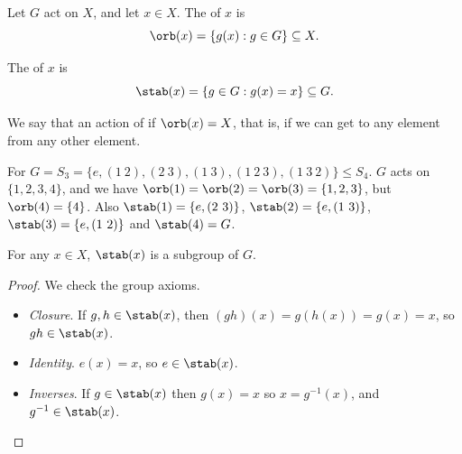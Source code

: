 \documentclass[a4paper]{scrartcl}
\begin{document}
\begin{center}
	

\end{center}

\begin{definition}[Orbit]
Let $G$ act on $X$, and let $x \in X$. The  of $x$ is
$$
	\orb(x) = \{ g(x) : g \in G \} \subseteq X.
$$
\end{definition}

\begin{definition}[Stabilizer]
The  of $x$ is
$$
\stab(x) = \{ g \in G : g(x) = x \} \subseteq G.
$$
\end{definition}

We say that an action of  if $\orb(x) = X$, that is, if we can get to any element from any other element.

\begin{example}
	For $G = S_3 = \{e, (1\ 2), (2\ 3), (1\ 3), (1\ 2\ 3), (1\ 3\ 2)\} \leq S_4$. $G$ acts on $\{1, 2, 3, 4\}$, and we have $\orb(1) = \orb(2) = \orb(3) =\{1, 2, 3\}$, but $\orb(4) = \{4\}$. Also $\stab(1) = \{e, (2\ 3)\}$, $\stab(2) = \{ e, (1\ 3)\}$, $\stab(3) = \{ e, (1\ 2)\}$ and $\stab(4) = G$.
\end{example}

\begin{lemma}
	For any $x \in X$, $\stab(x)$ is a subgroup of $G$.
\end{lemma}
\begin{proof}
	We check the group axioms.
	\begin{itemize}
		\item \emph{Closure}. If $g, h \in \stab(x)$, then $(gh)(x) = g(h(x)) = g(x) = x$, so $gh \in \stab(x)$.
		\item \emph{Identity}. $e(x) = x$, so $e \in \stab(x)$.
		\item \emph{Inverses}. If $g \in \stab(x)$ then $g(x) = x$ so $x = g^{-1}(x)$, and $g^{-1} \in \stab(x)$.
	\end{itemize}
\end{proof}
\end{document}
